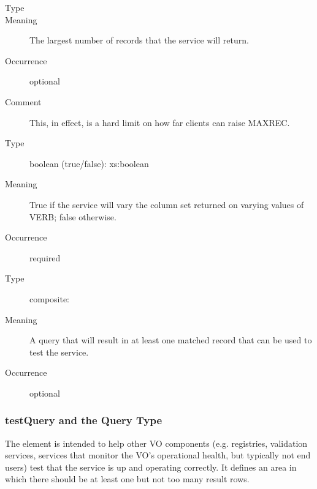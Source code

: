 \documentclass[11pt,a4paper]{ivoa}
\begin{document}
\begin{generated}
\begin{bigdescription}
\begin{description}
\end{description}
\item[Element \xmlel{maxRecords}]
\begin{description}
\item[Type] 
\item[Meaning] The largest number of records that the service will
                        return.
\item[Occurrence] optional
\item[Comment] This, in effect, is a hard limit on how far clients
                        can raise MAXREC.

\end{description}
\item[Element \xmlel{verbosity}]
\begin{description}
\item[Type] boolean (true/false): xs:boolean
\item[Meaning] True if the service will vary the column set
                        returned on varying values of VERB;
                        false otherwise.
\item[Occurrence] required

\end{description}
\item[Element \xmlel{testQuery}]
\begin{description}
\item[Type] composite: 
\item[Meaning] A query that will result in at least one
                        matched record that can be used to test the
                        service.
\item[Occurrence] optional

\end{description}


\end{bigdescription}\endgroup

\endgroup
\end{generated}


\subsubsection{testQuery and the Query Type}

The  element is intended to help other VO components (e.g.
registries, validation services, services that monitor the VO's
operational health, but typically not end users) test that the service
is up and operating correctly. It defines an area in which there should
be at least one but not too many result rows.
\end{document}
